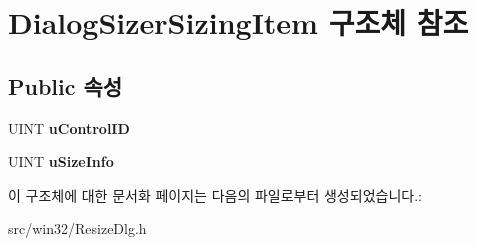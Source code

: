 \hypertarget{struct_dialog_sizer_sizing_item}{}\section{Dialog\+Sizer\+Sizing\+Item 구조체 참조}
\label{struct_dialog_sizer_sizing_item}
\subsection*{Public 속성}
\begin{DoxyCompactItemize}
\item 
\mbox{\label{struct_dialog_sizer_sizing_item_a2896a44af48c19cab4fb847bcf8fd755}} 
U\+I\+NT {\bfseries u\+Control\+ID}
\item 
\mbox{\label{struct_dialog_sizer_sizing_item_af673815342f29c205ec14476c57269c2}} 
U\+I\+NT {\bfseries u\+Size\+Info}
\end{DoxyCompactItemize}


이 구조체에 대한 문서화 페이지는 다음의 파일로부터 생성되었습니다.\+:\begin{DoxyCompactItemize}
\item 
src/win32/Resize\+Dlg.\+h\end{DoxyCompactItemize}
